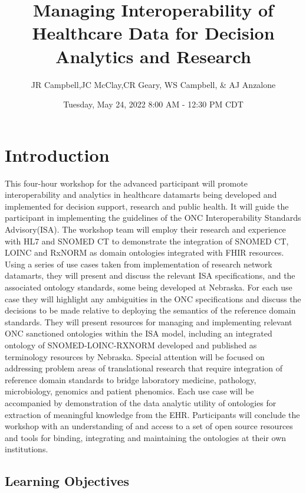 \documentclass[
]{journal}
\title{Managing Interoperability of Healthcare Data for Decision Analytics and Research}
\author{JR Campbell,JC McClay,CR Geary, WS Campbell, \& AJ Anzalone}
\date{Tuesday, May 24, 2022 8:00 AM - 12:30 PM CDT}
\begin{document}
\maketitle

{
\setcounter{tocdepth}{2}
\tableofcontents
}
\hypertarget{introduction}{%
\section{Introduction}\label{introduction}}

This four-hour workshop for the advanced participant will promote interoperability and analytics in healthcare datamarts being developed and implemented for decision support, research and public health. It will guide the participant in implementing the guidelines of the ONC Interoperability Standards Advisory(ISA). The workshop team will employ their research and experience with HL7 and SNOMED CT to demonstrate the integration of SNOMED CT, LOINC and RxNORM as domain ontologies integrated with FHIR resources. Using a series of use cases taken from implementation of research network datamarts, they will present and discuss the relevant ISA specifications, and the associated ontology standards, some being developed at Nebraska. For each use case they will highlight any ambiguities in the ONC specifications and discuss the decisions to be made relative to deploying the semantics of the reference domain standards. They will present resources for managing and implementing relevant ONC sanctioned ontologies within the ISA model, including an integrated ontology of SNOMED-LOINC-RXNORM developed and published as terminology resources by Nebraska. Special attention will be focused on addressing problem areas of translational research that require integration of reference domain standards to bridge laboratory medicine, pathology, microbiology, genomics and patient phenomics. Each use case will be accompanied by demonstration of the data analytic utility of ontologies for extraction of meaningful knowledge from the EHR. Participants will conclude the workshop with an understanding of and access to a set of open source resources and tools for binding, integrating and maintaining the ontologies at their own institutions.

\hypertarget{learning-objectives}{%
\subsection{Learning Objectives}\label{learning-objectives}}
\end{document}

